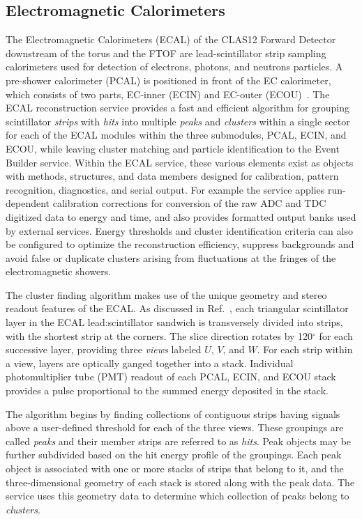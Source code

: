 \subsection{Electromagnetic Calorimeters}

The Electromagnetic Calorimeters (ECAL) of the CLAS12 Forward Detector downstream of the torus and the
FTOF are lead-scintillator strip sampling calorimeters used for detection of electrons, photons, and neutrons
particles. A pre-shower calorimeter (PCAL) is positioned in front of the EC calorimeter, which consists of two
parts, EC-inner (ECIN) and EC-outer (ECOU)~\cite{ecal-nim}. The ECAL reconstruction service provides a fast
and efficient algorithm for grouping scintillator {\it strips} with {\it hits} into multiple {\it peaks} and {\it clusters}
within a single sector for each of the ECAL modules within the three submodules, PCAL, ECIN, and ECOU, while
leaving cluster matching and particle identification to the Event Builder service. Within the ECAL service, these
various elements exist as objects with methods, structures, and data members designed for calibration, pattern
recognition, diagnostics, and serial output. For example the service applies run-dependent calibration corrections
for conversion of the raw ADC and TDC digitized data to energy and time, and also provides formatted output
banks used by external services.  Energy thresholds and cluster identification criteria can also be configured to
optimize the reconstruction efficiency, suppress backgrounds and avoid false or duplicate clusters arising from
fluctuations at the fringes of the electromagnetic showers.

The cluster finding algorithm makes use of the unique geometry and stereo readout features of the ECAL. As
discussed in Ref.~\cite{ecal-nim}, each triangular scintillator layer in the ECAL lead:scintillator sandwich is
transversely divided into strips, with the shortest strip at the corners. The slice direction rotates by 120$^\circ$
for each successive layer, providing three {\it views} labeled $U$, $V$, and $W$.  For each strip within a view,
layers are optically ganged together into a stack.  Individual photomultiplier tube (PMT) readout of each PCAL, ECIN,
and ECOU stack provides a pulse proportional to the summed energy deposited in the stack.

The algorithm begins by finding collections of contiguous strips having signals above a user-defined threshold for
each of the three views. These groupings are called {\it peaks} and their member strips are referred to as
{\it hits}.  Peak objects may be further subdivided based on the hit energy profile of the groupings. Each peak
object is associated with one or more stacks of strips that belong to it, and the three-dimensional geometry of each
stack is stored along with the peak data. The service uses this geometry data to determine which collection of
peaks belong to {\it clusters}.

